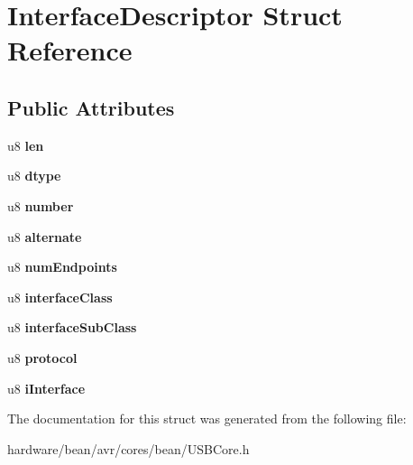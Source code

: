 \hypertarget{struct_interface_descriptor}{}\section{Interface\+Descriptor Struct Reference}
\label{struct_interface_descriptor}
\subsection*{Public Attributes}
\begin{DoxyCompactItemize}
\item 
\hypertarget{struct_interface_descriptor_a4a2810138576ef2662bb21dba8e9bbb8}{}u8 {\bfseries len}\label{struct_interface_descriptor_a4a2810138576ef2662bb21dba8e9bbb8}

\item 
\hypertarget{struct_interface_descriptor_a02fa9cbf3a3441fe54d3f70acff7b972}{}u8 {\bfseries dtype}\label{struct_interface_descriptor_a02fa9cbf3a3441fe54d3f70acff7b972}

\item 
\hypertarget{struct_interface_descriptor_a5a8c9c810eab8a56dd9d6f961d3795a9}{}u8 {\bfseries number}\label{struct_interface_descriptor_a5a8c9c810eab8a56dd9d6f961d3795a9}

\item 
\hypertarget{struct_interface_descriptor_a2ea37ffa5dd4d4f7d4977a0d6af80b1c}{}u8 {\bfseries alternate}\label{struct_interface_descriptor_a2ea37ffa5dd4d4f7d4977a0d6af80b1c}

\item 
\hypertarget{struct_interface_descriptor_a84292543c62d73f079110c4317df5047}{}u8 {\bfseries num\+Endpoints}\label{struct_interface_descriptor_a84292543c62d73f079110c4317df5047}

\item 
\hypertarget{struct_interface_descriptor_a11b902310604a5f67f557c5d3988af8e}{}u8 {\bfseries interface\+Class}\label{struct_interface_descriptor_a11b902310604a5f67f557c5d3988af8e}

\item 
\hypertarget{struct_interface_descriptor_a3bda2c8f386274d19f26bccd193907a2}{}u8 {\bfseries interface\+Sub\+Class}\label{struct_interface_descriptor_a3bda2c8f386274d19f26bccd193907a2}

\item 
\hypertarget{struct_interface_descriptor_af1883665abc968091c8f874b6b5d7a5f}{}u8 {\bfseries protocol}\label{struct_interface_descriptor_af1883665abc968091c8f874b6b5d7a5f}

\item 
\hypertarget{struct_interface_descriptor_a619e067a0bc90977d93821de8e22609e}{}u8 {\bfseries i\+Interface}\label{struct_interface_descriptor_a619e067a0bc90977d93821de8e22609e}

\end{DoxyCompactItemize}


The documentation for this struct was generated from the following file\+:\begin{DoxyCompactItemize}
\item 
hardware/bean/avr/cores/bean/U\+S\+B\+Core.\+h\end{DoxyCompactItemize}
